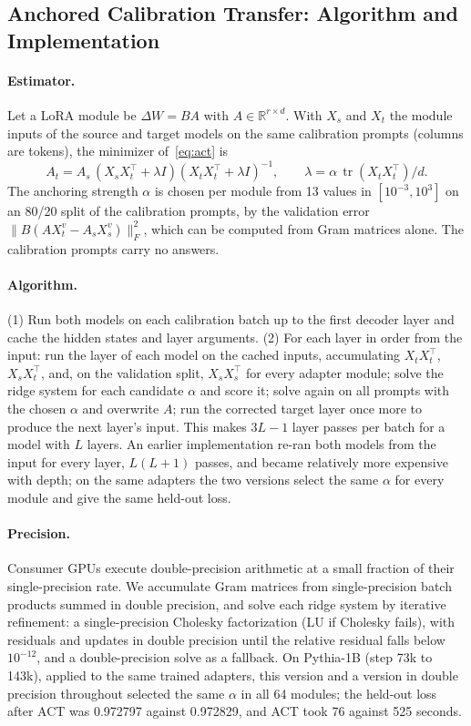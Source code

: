 \documentclass[ijds,nonblindrev]{informs4}
\begin{document}
\begin{APPENDICES}
\section{Anchored Calibration Transfer: Algorithm and Implementation}\label{app:act}

\paragraph{Estimator.} Let a LoRA module be $\Delta W=BA$ with $A\in\mathbb R^{r\times d}$. With $X_s$ and $X_t$ the module inputs of the source and target models on the same calibration prompts (columns are tokens), the minimizer of~\eqref{eq:act} is
\[
A_t=A_s\,(X_sX_t^{\top}+\lambda I)(X_tX_t^{\top}+\lambda I)^{-1},\qquad \lambda=\alpha\,\operatorname{tr}(X_tX_t^{\top})/d .
\]
The anchoring strength $\alpha$ is chosen per module from 13 values in $[10^{-3},10^{3}]$ on an 80/20 split of the calibration prompts, by the validation error $\|B(AX^v_t-A_sX^v_s)\|_F^2$, which can be computed from Gram matrices alone. The calibration prompts carry no answers.

\paragraph{Algorithm.} (1) Run both models on each calibration batch up to the first decoder layer and cache the hidden states and layer arguments. (2) For each layer in order from the input: run the layer of each model on the cached inputs, accumulating $X_tX_t^\top$, $X_sX_t^\top$, and, on the validation split, $X_sX_s^\top$ for every adapter module; solve the ridge system for each candidate $\alpha$ and score it; solve again on all prompts with the chosen $\alpha$ and overwrite $A$; run the corrected target layer once more to produce the next layer's input. This makes $3L-1$ layer passes per batch for a model with $L$ layers. An earlier implementation re-ran both models from the input for every layer, $L(L+1)$ passes, and became relatively more expensive with depth; on the same adapters the two versions select the same $\alpha$ for every module and give the same held-out loss.

\paragraph{Precision.} Consumer GPUs execute double-precision arithmetic at a small fraction of their single-precision rate. We accumulate Gram matrices from single-precision batch products summed in double precision, and solve each ridge system by iterative refinement: a single-precision Cholesky factorization (LU if Cholesky fails), with residuals and updates in double precision until the relative residual falls below $10^{-12}$, and a double-precision solve as a fallback. On Pythia-1B (step 73k to 143k), applied to the same trained adapters, this version and a version in double precision throughout selected the same $\alpha$ in all 64 modules; the held-out loss after ACT was 0.972797 against 0.972829, and ACT took 76 against 525 seconds.


\end{APPENDICES}
\end{document}
